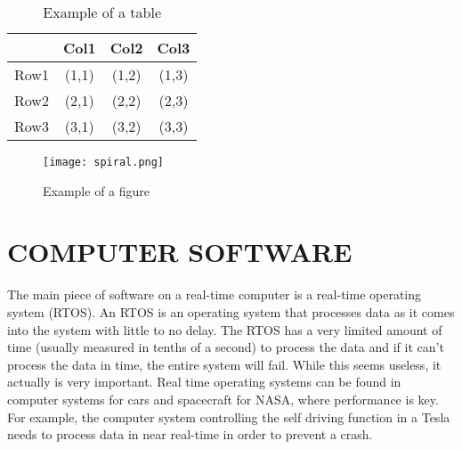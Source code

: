 \documentclass[letterpaper, 10 pt, conference]{IEEEconf}
\begin{document}
\begin{comment}
You should list the specification of any hardware your topic
uses here. If you want make a table here, please label the table
and include discussion on what components are included in the
table and why. See Table
\ref{tbl:example} for an example of a table.
The labels/captions of the table should be put at the bottom
of the table. 
\end{comment}

\begin{table}[h!]
\begin{center}
\begin{tabular}{||c | c | c | c||} 
\hline
  & Col1 & Col2 & Col3 \\ [0.5ex]
\hline\hline
Row1 & (1,1) & (1,2) & (1,3) \\ 
\hline
Row2 & (2,1) & (2,2) & (2,3) \\
\hline
Row3 & (3,1) & (3,2) & (3,3) \\
\hline
\end{tabular}
\caption{Example of a table}
\label{tbl:example}
\end{center}
\end{table}

\begin{comment}
You might want to put figures in the document. Please
remember to label them. The labels/captions of the figures
should be put at the bottom of the figure. See Figure
\ref{fig:example} for an example of how to use figures.
You will need to place the figure in an \texttt{images/} folder
in your working directory.
\end{comment}

\begin{figure}[h!]
\centering
\texttt{[image: spiral.png]}
\caption{Example of a figure}
\label{fig:example}
\end{figure} 

\section{COMPUTER SOFTWARE}

The main piece of software on a real-time computer is a real-time operating system (RTOS). An RTOS is an operating system
that processes data as it comes into the system with little to no delay. The RTOS has a very limited amount of time (usually
measured in tenths of a second) to process the data and if it can't process the data in time, the entire system will fail. While this seems useless, it actually
is very important. Real time operating systems can be found in computer systems for cars and spacecraft for NASA, where performance
is key. For example, the computer system controlling the self driving function in a Tesla needs to process data in near real-time
in order to prevent a crash.
\end{document}
